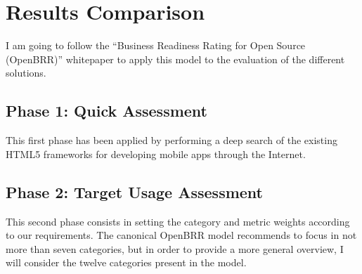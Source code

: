 \documentclass[a4paper,12pt]{book}
\begin{document}






\chapter{Results Comparison}
\label{chap:results}

I am going to follow the ``Business Readiness Rating for Open Source
(OpenBRR)'' whitepaper\cite{OpenBRRWhitepaper} to apply this model to the
evaluation of the different solutions.

\section{Phase 1: Quick Assessment}
\label{sec:phase1}
This first phase has been applied by performing a deep search of the existing HTML5 frameworks for developing mobile apps through the Internet.





\section{Phase 2: Target Usage Assessment}
\label{sec:phase2}
This second phase consists in setting the category and metric weights according to our requirements. The canonical OpenBRR model recommends to focus in not more than seven categories, but in order to provide a more general overview, I will consider the twelve categories present in the model.
\end{document}
